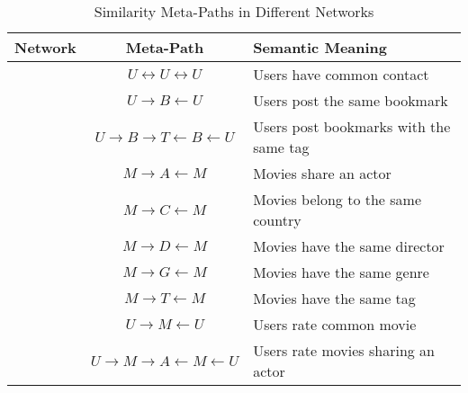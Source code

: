 \begin{table}[t]
	\centering
	\caption{Similarity Meta-Paths in Different Networks}
	\label{table:meta}
	\scriptsize
	\begin{tabu} to \columnwidth {c c X[l]}
		\toprule
		Network & Meta-Path & Semantic Meaning \\
		\midrule
		& $U\leftrightarrow U\leftrightarrow U$ & Users have common contact\\
		& $U\rightarrow B\leftarrow U$ & Users post the same bookmark\\
		& $U\rightarrow B\rightarrow T\leftarrow B\leftarrow U$ & Users post bookmarks with the same tag\\[0.05cm]
		\midrule
		& $M\rightarrow A\leftarrow M$ & Movies share an actor\\
		& $M\rightarrow C\leftarrow M$ & Movies belong to the same country\\
		& $M\rightarrow D\leftarrow M$ & Movies have the same director\\
		& $M\rightarrow G\leftarrow M$ & Movies have the same genre\\
		& $M\rightarrow T\leftarrow M$ & Movies have the same tag\\
		& $U\rightarrow M\leftarrow U$ & Users rate common movie\\
		& $U\rightarrow M\rightarrow A\leftarrow M\leftarrow U$ & Users rate movies sharing an actor\\

\end{tabu}
\end{table}
